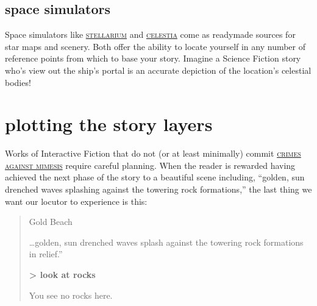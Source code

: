 \subsection{space simulators}
\noindent Space simulators like \href{https://stellarium.org/}{\textsc{stellarium}} and
\href{https://celestia.space/}{\textsc{celestia}} come as ready\textendash made sources
for star maps and scenery. Both offer the ability to locate yourself in any
number of reference points from which to base your story. Imagine a Science
Fiction story who's view out the ship's portal is an accurate depiction of the
location's celestial bodies!

\section{plotting the story layers}
Works of Interactive Fiction that do not (or at least minimally) commit
\href{http://pdf.textfiles.com/books/iftheorybook.pdf}{\textsc{crimes against mimesis}}
require careful planning. When the reader is rewarded having achieved the next
phase of the story to a beautiful scene including, ``golden, sun\textendash
drenched waves splashing against the towering rock formations,'' the last thing
we want our locutor to experience is this:
\begin{quote}
  Gold Beach
  
  \ldots golden, sun\textendash
  drenched waves splash against the towering rock formations in relief.''

  \textbf{> look at rocks}

  You see no rocks here.
\end{quote}

